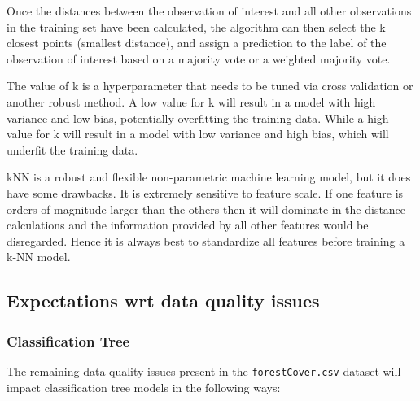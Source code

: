 \documentclass[conference]{IEEEtran}
\begin{document}
Once the distances between the observation of interest and all other observations in the training set have been calculated, the algorithm can then select the k closest points (smallest distance), and assign a prediction to the label of the observation of interest based on a majority vote or a weighted majority vote.

The value of k is a hyperparameter that needs to be tuned via cross validation or another robust method. A low value for k will result in a model with high variance and low bias, potentially overfitting the training data. While a high value for k will result in a model with low variance and high bias, which will underfit the training data.

kNN is a robust and flexible non-parametric machine learning model, but it does have some drawbacks. It is extremely sensitive to feature scale. If one feature is orders of magnitude larger than the others then it will dominate in the distance calculations and the information provided by all other features would be disregarded. Hence it is always best to standardize all features before training a k-NN model.

\subsection{\textbf{Expectations wrt data quality issues}}

\subsubsection{\textbf{Classification Tree}}

The remaining data quality issues present in the \texttt{forestCover.csv} dataset will impact classification tree models in the following ways:
\end{document}
